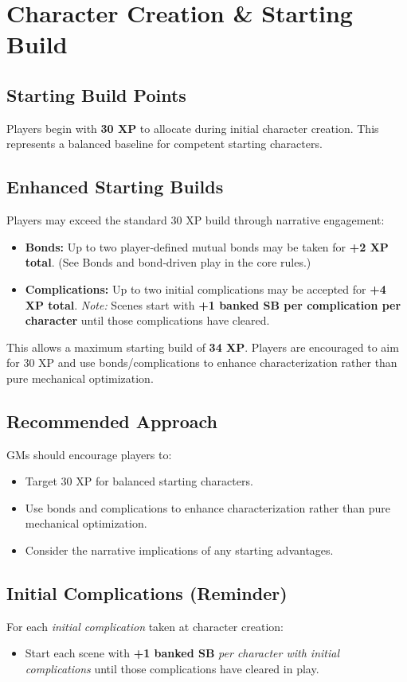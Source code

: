 \section{Character Creation \& Starting Build}

\subsection{Starting Build Points}
Players begin with \textbf{30 XP} to allocate during initial character creation. This represents a balanced baseline for competent starting characters.

\subsection{Enhanced Starting Builds}
Players may exceed the standard 30 XP build through narrative engagement:
\begin{itemize}
  \item \textbf{Bonds:} Up to two player‑defined mutual bonds may be taken for \textbf{+2 XP total}. (See Bonds and bond‑driven play in the core rules.)
  \item \textbf{Complications:} Up to two initial complications may be accepted for \textbf{+4 XP total}. \emph{Note:} Scenes start with \textbf{+1 banked SB per complication per character} until those complications have cleared.
\end{itemize}
This allows a maximum starting build of \textbf{34 XP}. Players are encouraged to aim for 30 XP and use bonds/complications to enhance characterization rather than pure mechanical optimization.

\subsection{Recommended Approach}
GMs should encourage players to:
\begin{itemize}
  \item Target 30 XP for balanced starting characters.
  \item Use bonds and complications to enhance characterization rather than pure mechanical optimization.
  \item Consider the narrative implications of any starting advantages.
\end{itemize}

\subsection{Initial Complications (Reminder)}
For each \emph{initial complication} taken at character creation:
\begin{itemize}
  \item Start each scene with \textbf{+1 banked SB} \emph{per character with initial complications} until those complications have cleared in play.
\end{itemize}

